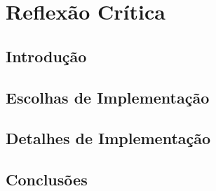 \chapter{Reflexão Crítica}

\section{Introdução}
\label{chap5:sec:intro}


\section{Escolhas de Implementação}
\label{chap5:escolhas_implementacao}

\section{Detalhes de Implementação}

\section{Conclusões}
